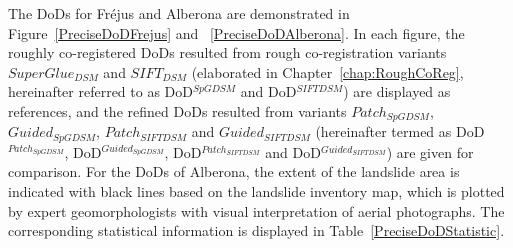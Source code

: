 
The \ac{DoD}s for Fr{\'e}jus and Alberona are demonstrated in Figure~\ref{PreciseDoDFrejus} and ~\ref{PreciseDoDAlberona}. 
In each figure, the roughly co-registered \ac{DoD}s resulted from rough co-registration variants $SuperGlue_{DSM}$ and $SIFT_{DSM}$ (elaborated in Chapter~\ref{chap:RoughCoReg}, hereinafter referred to as DoD$^{SpGDSM}$ and DoD$^{SIFTDSM}$) are displayed as references, and the refined \ac{DoD}s resulted from variants $Patch_{SpGDSM}$, $Guided_{SpGDSM}$, $Patch_{SIFTDSM}$ and $Guided_{SIFTDSM}$ (hereinafter termed as DoD$^{Patch_{SpGDSM}}$, DoD$^{Guided_{SpGDSM}}$, DoD$^{Patch_{SIFTDSM}}$ and DoD$^{Guided_{SIFTDSM}}$) are given for comparison. 
For the \ac{DoD}s of Alberona, the extent of the landslide area is indicated with black lines based on the landslide inventory map, which is plotted by expert geomorphologists with visual interpretation of aerial photographs. 
The corresponding statistical information is displayed in Table~\ref{PreciseDoDStatistic}.\\




